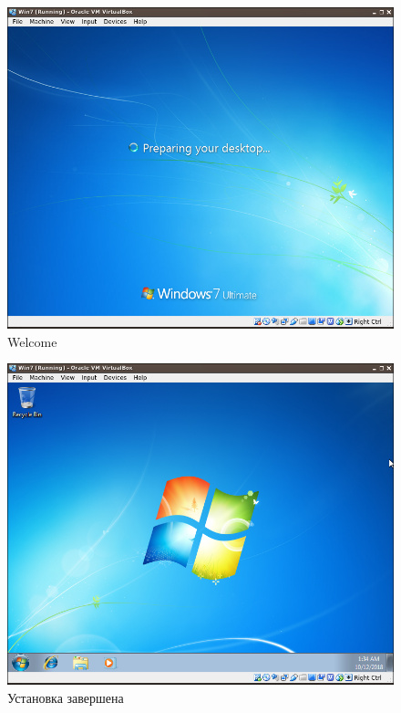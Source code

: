 \documentclass[a4paper]{article}
\begin{document}
\begin{figure}[H]
    \centering
    \includegraphics[width=\linewidth]{30.png}
    \caption{Welcome}
\end{figure}


\begin{figure}[H]
    \centering
    \includegraphics[width=\linewidth]{31.png}
    \caption{Установка завершена}
\end{figure}
\end{document}
